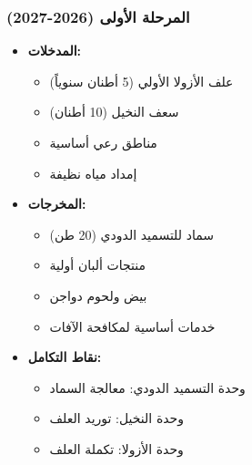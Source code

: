 \subsubsection{المرحلة الأولى (2026-2027)}
\begin{itemize}
    \item \textbf{المدخلات:}
    \begin{itemize}
        \item علف الأزولا الأولي (5 أطنان سنوياً)
        \item سعف النخيل (10 أطنان)
        \item مناطق رعي أساسية
        \item إمداد مياه نظيفة
    \end{itemize}
    \item \textbf{المخرجات:}
    \begin{itemize}
        \item سماد للتسميد الدودي (20 طن)
        \item منتجات ألبان أولية
        \item بيض ولحوم دواجن
        \item خدمات أساسية لمكافحة الآفات
    \end{itemize}
    \item \textbf{نقاط التكامل:}
    \begin{itemize}
        \item وحدة التسميد الدودي: معالجة السماد
        \item وحدة النخيل: توريد العلف
        \item وحدة الأزولا: تكملة العلف
    \end{itemize}
\end{itemize}


